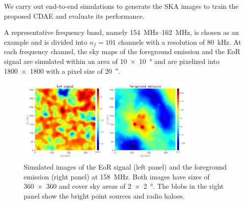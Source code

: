 \documentclass[fleqn,usenatbib]{mnras}
\newcommand{\editone}[1]{{\leavevmode\color{cyan}#1}}
\begin{document}
We carry out end-to-end simulations to generate the SKA images to
train the proposed CDAE and evaluate its performance.
\editone{%
A representative frequency band, namely \SIrange{154}{162}{\MHz}, is chosen
as an example \citep[e.g.,][]{datta2010} and is divided into $n_f = 101$
channels with a resolution of \SI{80}{\kHz}.
At each frequency channel, the sky maps of the foreground emission and the
EoR signal are simulated within an area of \SI{10 x 10}{\degree} and are
pixelized into \num{1800 x 1800} with a pixel size of \SI{20}{\arcsecond}.

\begin{figure}
  \centering
  \includegraphics[width=0.8\textwidth]{obsimg-158}
  \caption{\label{fig:obsimg}\editone{%
    Simulated images of the EoR signal (left panel) and the foreground
    emission (right panel) at \SI{158}{\MHz}.
    Both images have sizes of \num{360 x 360} and cover sky areas of
    \SI{2 x 2}{\degree}.
    The blobs in the right panel show the bright point sources and radio
    haloes.
  }}
\end{figure}

}
\end{document}
